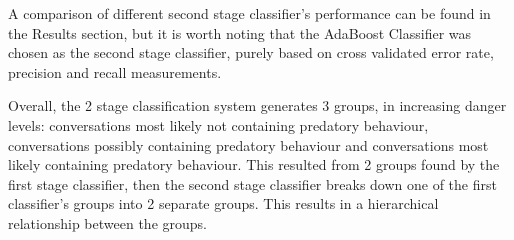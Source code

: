 \documentclass[11pt]{article}
\begin{document}
A comparison of different second stage classifier's performance can be found in the Results section, but it is worth noting that the AdaBoost Classifier \cite{freund1996experiments} was chosen as the second stage classifier, purely based on cross validated error rate, precision and recall measurements.

Overall, the 2 stage classification system generates 3 groups, in increasing danger levels: conversations most likely not containing predatory behaviour,  conversations possibly containing predatory behaviour and conversations most likely containing predatory behaviour. This resulted from 2 groups found by the first stage classifier, then the second stage classifier breaks down one of the first classifier's groups into 2 separate groups. This results in a hierarchical relationship between the groups.
\end{document}
